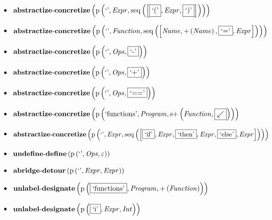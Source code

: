 {\begin{itemize}
\item $\mathbf{abstractize\text{-}concretize}\\\left(\mathrm{p}\left(\text{`'},\mathit{Expr},\mathrm{seq}\left(\left[\fbox{$\text{`('}$}, \mathit{Expr}, \fbox{$\text{`)'}$}\right]\right)\right)\right)$
\item $\mathbf{abstractize\text{-}concretize}\\\left(\mathrm{p}\left(\text{`'},\mathit{Function},\mathrm{seq}\left(\left[\mathit{Name}, {+}\left(\mathit{Name}\right), \fbox{$\text{`='}$}, \mathit{Expr}\right]\right)\right)\right)$
\item $\mathbf{abstractize\text{-}concretize}\\\left(\mathrm{p}\left(\text{`'},\mathit{Ops},\fbox{$\text{`-'}$}\right)\right)$
\item $\mathbf{abstractize\text{-}concretize}\\\left(\mathrm{p}\left(\text{`'},\mathit{Ops},\fbox{$\text{`+'}$}\right)\right)$
\item $\mathbf{abstractize\text{-}concretize}\\\left(\mathrm{p}\left(\text{`'},\mathit{Ops},\fbox{$\text{`=='}$}\right)\right)$
\item $\mathbf{abstractize\text{-}concretize}\\\left(\mathrm{p}\left(\text{`functions'},\mathit{Program},\mathrm{s}{+}\left(\mathit{Function},\fbox{${\swarrow}$}\right)\right)\right)$
\item $\mathbf{abstractize\text{-}concretize}\\\left(\mathrm{p}\left(\text{`'},\mathit{Expr},\mathrm{seq}\left(\left[\fbox{$\text{`if'}$}, \mathit{Expr}, \fbox{$\text{`then'}$}, \mathit{Expr}, \fbox{$\text{`else'}$}, \mathit{Expr}\right]\right)\right)\right)$
\item $\mathbf{undefine\text{-}define}\\\left(\mathrm{p}\left(\text{`'},\mathit{Ops},\varepsilon\right)\right)$
\item $\mathbf{abridge\text{-}detour}\\\left(\mathrm{p}\left(\text{`'},\mathit{Expr},\mathit{Expr}\right)\right)$
\item $\mathbf{unlabel\text{-}designate}\\\left(\mathrm{p}\left(\fbox{\text{`functions'}},\mathit{Program},{+}\left(\mathit{Function}\right)\right)\right)$
\item $\mathbf{unlabel\text{-}designate}\\\left(\mathrm{p}\left(\fbox{\text{`i'}},\mathit{Expr},\mathit{Int}\right)\right)$

\end{itemize}}
